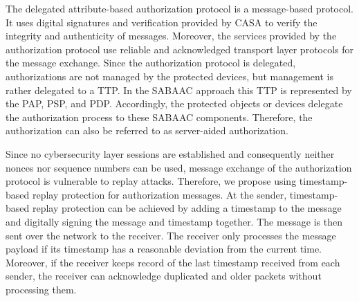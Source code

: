 The delegated attribute-based authorization protocol is a message-based protocol.
It uses digital signatures and verification provided by CASA to verify the integrity and authenticity of messages.
Moreover, the services provided by the authorization protocol use reliable and acknowledged transport layer protocols for the message exchange.
Since the authorization protocol is delegated, authorizations are not managed by the protected devices, but management is rather delegated to a TTP.
In the SABAAC approach this TTP is represented by the PAP, PSP, and PDP.
Accordingly, the protected objects or devices delegate the authorization process to these SABAAC components.
Therefore, the authorization can also be referred to as server-aided authorization.

Since no cybersecurity layer sessions are established and consequently neither nonces nor sequence numbers can be used, message exchange of the authorization protocol is vulnerable to replay attacks.
Therefore, we propose using timestamp-based replay protection for authorization messages.
At the sender, timestamp-based replay protection can be achieved by adding a timestamp to the message and digitally signing the message and timestamp together.
The message is then sent over the network to the receiver.
The receiver only processes the message payload if its timestamp has a reasonable deviation from the current time.
Moreover, if the receiver keeps record of the last timestamp received from each sender, the receiver can acknowledge duplicated and older packets without processing them.

